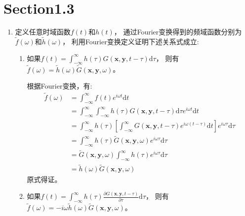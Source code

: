 \section*{Section1.3}

\begin{enumerate}
    \item 定义任意时域函数$f(t)$和$h(t)$，
    通过Fourier变换得到的频域函数分别为$\tilde{f}(\omega)$和$\tilde{h}(\omega)$，
    利用Fourier变换定义证明下述关系式成立:
    \begin{enumerate}
        \item 如果$f(t) = \int_{-\infty}^{\infty} h(\tau) G(\mathbf{x},\mathbf{y},t-\tau) \mathrm{d} \tau$，
            则有$\tilde{f}(\omega) = \tilde{h}(\omega) \tilde{G} (\mathbf{x},\mathbf{y},\omega)$。

            根据Fourier变换，有:
            \begin{equation}
                \label{eq:conclusion 1}
                \begin{aligned}
                    \tilde{f}(\omega) &= \int_{-\infty}^{\infty} f(t) e^{i \omega t} \mathrm{d} t \\
                    &= \int_{-\infty}^{\infty} \int_{-\infty}^{\infty} h(\tau) G(\mathbf{x},\mathbf{y},t-\tau) \mathrm{d} \tau e^{i \omega t} \mathrm{d} t \\
                    &= \int_{-\infty}^{\infty} h(\tau) \left[ \int_{-\infty}^{\infty} G(\mathbf{x},\mathbf{y},t-\tau) e^{i \omega (t-\tau)} \mathrm{d} t \right] e^{i \omega \tau} \mathrm{d} \tau \\
                    &= \int_{-\infty}^{\infty} h(\tau) \tilde{G} (\mathbf{x},\mathbf{y},\omega) e^{i \omega \tau} \mathrm{d} \tau \\
                    &= \tilde{G} (\mathbf{x},\mathbf{y},\omega) \int_{-\infty}^{\infty} h(\tau) e^{i \omega \tau} \mathrm{d} \tau \\
                    &= \tilde{h}(\omega) \tilde{G} (\mathbf{x},\mathbf{y},\omega)
                \end{aligned}
            \end{equation}
            原式得证。


        \item 如果$f(t) = \int_{-\infty}^{\infty} h(\tau) \frac{\partial G(\mathbf{x},\mathbf{y},t-\tau)}{\partial \tau} \mathrm{d} \tau$，
            则有$\tilde{f}(\omega) = - i \omega \tilde{h}(\omega) \tilde{G} (\mathbf{x},\mathbf{y},\omega)$。


\end{enumerate}
\end{enumerate}
